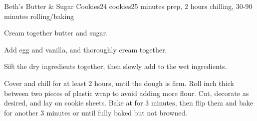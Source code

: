 \documentclass[../Cookbook.tex]{subfiles}
\begin{document}
\begin{recipe}{Beth's Butter \& Sugar Cookies}{24 cookies}{25 minutes prep, 2 hours chilling, 30-90 minutes rolling/baking}

	Cream together butter and sugar.

	Add egg and vanilla, and thoroughly cream together.

	Sift the dry ingredients together, then slowly add to the wet ingredients.

	\newstep
	Cover and chill for at least 2 hours, until the dough is firm. Roll  inch thick between two pieces of plastic wrap to avoid adding more flour. Cut, decorate as desired, and lay on cookie sheets. Bake at  for
	3 minutes, then flip them and bake for another 3 minutes %
	or until fully baked but not browned.

\end{recipe}
\end{document}
